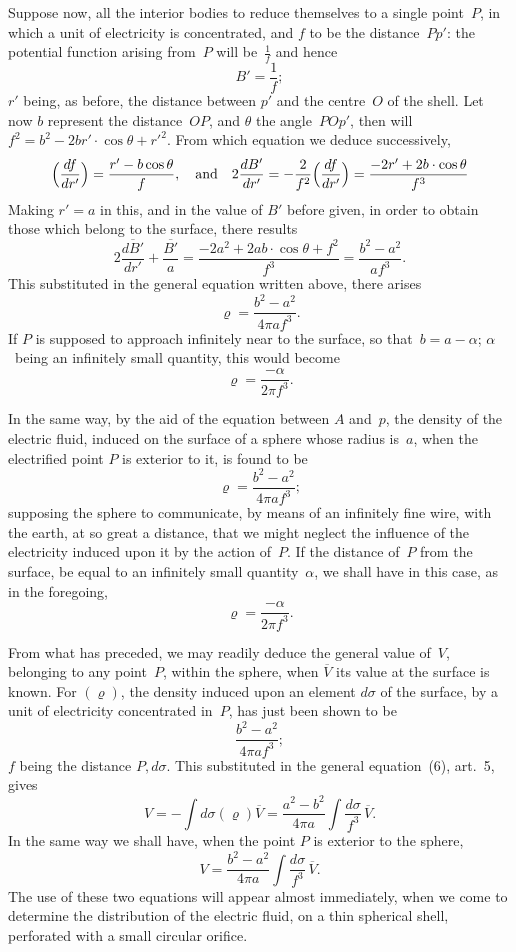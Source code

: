 \documentclass[12pt,notitlepage]{amsart}
\renewcommand{\rho}{\varrho}
\begin{document}
Suppose now, all the interior bodies to reduce themselves to a single
point~$P$, in which a unit of electricity is concentrated, and $f$ to be the
distance~$Pp'$: the potential function arising from~$P$
will be~$\frac1f$ and hence
\[
B'=\frac1f;
\]
$r'$ being, as before, the distance between $p'$ and the centre~$O$
of the shell.
Let now $b$ represent the distance~$OP$,
and $\theta$ the angle~$POp'$, then will
$f^2=b^2-2br'\cdot\cos\theta+r'^2$.
From which equation we deduce successively,
\[
\Bigl(\frac{df}{dr'}\Bigr)=\frac{r'-b\cos\theta}{f},
\quad\text{and}\quad
2\frac{dB'}{dr'}=-\frac{2}{f^2}\Bigl(\frac{df}{dr'}\Bigr)
=\frac{-2r'+2b\cdot\cos\theta}{f^3}
\]
Making $r'=a$ in this, and in the value of $B'$ before given, in order to obtain those which belong to the surface, there results
\[
2\frac{\overline{dB'}}{dr'}+\frac{\overline{B'}}{a}=
\frac{-2a^2+2ab\cdot\cos\theta+f^2}{f^3}=
\frac{b^2-a^2}{af^3}.
\]
This substituted in the general equation written above, there arises
\[
\rho=\frac{b^2-a^2}{4\pi af^3}.
\]
If $P$ is supposed to approach infinitely near to the surface,
so that~${b=a-\alpha}$;
$\alpha$~being an infinitely small quantity, this would become
\[
\rho=\frac{-\alpha}{2\pi f^3}.
\]

In the same way, by the aid of the equation between $A$ and~$p$, the
density of the electric fluid, induced on the surface of a sphere whose radius
is~$a$, when the electrified point $P$ is exterior to it, is found to be
\[
\rho=\frac{b^2-a^2}{4\pi af^3};
\]
supposing the sphere to communicate, by means of an infinitely fine wire,
with the earth, at so great a distance, that we might neglect the influence
of the electricity induced upon it by the action of~$P$. If the distance of~$P$
from the surface,
be equal to an infinitely small quantity~$\alpha$, we shall have in
this case, as in the foregoing,
\[
\rho=\frac{-\alpha}{2\pi f^3}.
\]

From what has preceded, we may readily deduce the general value
of~$V$, belonging to any point~$P$, within the sphere,
when $\overline{V}$ its value at the
surface is known. For $(\rho)$, the density induced upon
an element $d\sigma$ of the
surface, by a unit of electricity concentrated in~$P$, has just been shown to be
\[
\frac{b^2-a^2}{4\pi af^3};
\]
$f$ being the distance $P,d\sigma$.
This substituted in the general equation~(6),
art.~5, gives
\[
\tag{10.}
V=-\int d\sigma(\rho)\overline{V}
=\frac{a^2-b^2}{4\pi a}\int\frac{d\sigma}{f^3}\,\overline{V}.
\]
In the same way we shall have, when the point $P$ is exterior to the sphere,
\[
\tag{11.}
V=\frac{b^2-a^2}{4\pi a}\int\frac{d\sigma}{f^3}\,\overline{V}.
\]
The use of these two equations will appear almost immediately, when we
come to determine the distribution of the electric fluid, on a thin spherical
shell, perforated with a small circular orifice.
\end{document}
